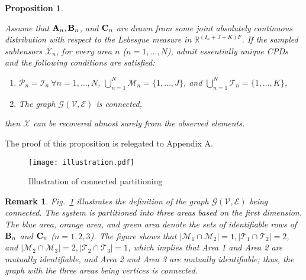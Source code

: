 \documentclass[journal]{IEEEtran}
\newcounter{propose}
\newtheorem{proposition}[propose]{Proposition}
\newtheorem{remark}{Remark}
\newcommand{\cpd}[3]{\llbracket #1, #2, #3 \rrbracket}
\newcommand{\A}{{\bf A}}
\newcommand{\B}{{\bf B}}
\newcommand{\C}{{\bf C}}
\newcommand{\Ten}[1]{\mathcal{#1}}
\begin{document}
\begin{proposition}
\label{proposition:identifiability}
\iffalse
Let $\Ten{X}={\cpd{\A}{\B}{\C}}\in\mathbb{R}^{I\times J\times K}$ be the whole tensor to be completed,  $\Ten{X}_n={\cpd{\A_n}{\B_n}{\C_n}}\in\mathbb{R}^{I_i\times J\times K}$ ($n=1,\ldots, N$) of rank $F$ be the subtensor to be completed in area $n$ satisfying that $\Ten{X} =[\Ten{X}_1;\ldots; \Ten{X}_N]$, $\A=[\A_1;\ldots; \A_N]$, $\B_n=\B$, and $\C_n=\C$, and $\Ten{\bar{X}}_n$ denote the sampled subtensor in area $n$.\fi
Assume that  $\A_n, \B_n$, and $\C_n$ are drawn
from some joint absolutely continuous distribution with respect
to the Lebesgue measure in $\mathbb{R}^{(I_n+J+K)F}$. If the sampled subtensors $\Ten{\bar{X}}_n$, for every area $n$ ($n=1,\ldots, N$), admit essentially unique CPDs 
and the following conditions are satisfied:
	\begin{enumerate}[start=1,label={ \arabic*)}]
		\item $ \mathcal{P}_n=\mathcal{I}_n\  \forall n=1,\ldots, N$, $\bigcup_{n=1}^N \mathcal{M}_n=\{1,\ldots,J\}$, and  $\bigcup_{n=1}^N \mathcal{T}_n=\{1,\ldots, K\}$,
		\item The graph $\mathcal{G}(\mathcal{V}, \mathcal{E})$ is connected,
	\end{enumerate}
	then $\Ten{X}$ can be recovered almost surely from the observed elements.
\end{proposition}
The proof of this proposition is relegated to Appendix A.
\begin{figure}
    \centering
  \texttt{[image: illustration.pdf]}
    \caption{Illustration of connected partitioning}
    \label{fig:illustration}\vspace{-15pt}
\end{figure}
\begin{remark}
Fig.~\ref{fig:illustration} illustrates the definition of the graph $\mathcal{G}(\mathcal{V}, \mathcal{E})$ being connected. The system is partitioned into three areas based on the first dimension. The blue area, orange area, and green area denote the sets of identifiable rows of $\B_n$ and $\C_n$ ($n=1,2,3$). The figure shows that $|\mathcal{M}_1\cap \mathcal{M}_2|=1, |\mathcal{T}_1\cap \mathcal{T}_2|=2$, and $|\mathcal{M}_2\cap \mathcal{M}_3|=2, |\mathcal{T}_2\cap \mathcal{T}_3|=1$, which implies that Area 1 and Area 2 are mutually identifiable, and Area 2 and Area 3 are mutually identifiable; thus, the graph with the three areas being vertices is connected. 
\end{remark}
\end{document}
